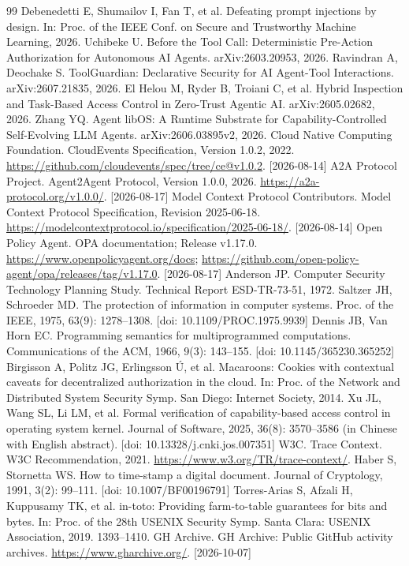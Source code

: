 {\begin{thebibliography}{99}
 Debenedetti E, Shumailov I, Fan T, et al. Defeating prompt injections by design. In: Proc. of the IEEE Conf. on Secure and Trustworthy Machine Learning, 2026.
 Uchibeke U. Before the Tool Call: Deterministic Pre-Action Authorization for Autonomous AI Agents. arXiv:2603.20953, 2026.
 Ravindran A, Deochake S. ToolGuardian: Declarative Security for AI Agent-Tool Interactions. arXiv:2607.21835, 2026.
 El Helou M, Ryder B, Troiani C, et al. Hybrid Inspection and Task-Based Access Control in Zero-Trust Agentic AI. arXiv:2605.02682, 2026.
 Zhang YQ. Agent libOS: A Runtime Substrate for Capability-Controlled Self-Evolving LLM Agents. arXiv:2606.03895v2, 2026.
 Cloud Native Computing Foundation. CloudEvents Specification, Version 1.0.2, 2022. \url{https://github.com/cloudevents/spec/tree/ce@v1.0.2}. [2026-08-14]
 A2A Protocol Project. Agent2Agent Protocol, Version 1.0.0, 2026. \url{https://a2a-protocol.org/v1.0.0/}. [2026-08-17]
 Model Context Protocol Contributors. Model Context Protocol Specification, Revision 2025-06-18. \url{https://modelcontextprotocol.io/specification/2025-06-18/}. [2026-08-14]
 Open Policy Agent. OPA documentation; Release v1.17.0. \url{https://www.openpolicyagent.org/docs}; \url{https://github.com/open-policy-agent/opa/releases/tag/v1.17.0}. [2026-08-17]
 Anderson JP. Computer Security Technology Planning Study. Technical Report ESD-TR-73-51, 1972.
 Saltzer JH, Schroeder MD. The protection of information in computer systems. Proc. of the IEEE, 1975, 63(9): 1278--1308. [doi: 10.1109/PROC.1975.9939]
 Dennis JB, Van Horn EC. Programming semantics for multiprogrammed computations. Communications of the ACM, 1966, 9(3): 143--155. [doi: 10.1145/365230.365252]
 Birgisson A, Politz JG, Erlingsson \'{U}, et al. Macaroons: Cookies with contextual caveats for decentralized authorization in the cloud. In: Proc. of the Network and Distributed System Security Symp. San Diego: Internet Society, 2014.
 Xu JL, Wang SL, Li LM, et al. Formal verification of capability-based access control in operating system kernel. Journal of Software, 2025, 36(8): 3570--3586 (in Chinese with English abstract). [doi: 10.13328/j.cnki.jos.007351]
 W3C. Trace Context. W3C Recommendation, 2021. \url{https://www.w3.org/TR/trace-context/}.
 Haber S, Stornetta WS. How to time-stamp a digital document. Journal of Cryptology, 1991, 3(2): 99--111. [doi: 10.1007/BF00196791]
 Torres-Arias S, Afzali H, Kuppusamy TK, et al. in-toto: Providing farm-to-table guarantees for bits and bytes. In: Proc. of the 28th USENIX Security Symp. Santa Clara: USENIX Association, 2019. 1393--1410.
 GH Archive. GH Archive: Public GitHub activity archives. \url{https://www.gharchive.org/}. [2026-10-07]
\end{thebibliography}
}
